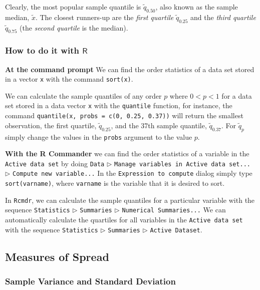 \documentclass[captions=tableheading]{scrbook}
\begin{document}
Clearly, the most popular sample quantile is \(\tilde{q}_{0.50}\), also known as the sample median, \(\tilde{x}\). The closest runners-up are the \emph{first quartile} \(\tilde{q}_{0.25}\) and the \emph{third quartile} \(\tilde{q}_{0.75}\) (the \emph{second quartile} is the median). 
\subsubsection{How to do it with \(\mathsf{R}\)}
\label{sec-3-3-3-1}


\textbf{At the command prompt}
We can find the order statistics of a data set stored in a vector \texttt{x} with the command \texttt{sort(x)}.

We can calculate the sample quantiles of any order \(p\) where \(0<p<1\) for a data set stored in a data vector \texttt{x} with the \texttt{quantile} function, for instance, the command \texttt{quantile(x, probs = c(0, 0.25, 0.37))} will return the smallest observation, the first quartile, \(\tilde{q}_{0.25}\), and the 37th sample quantile, \(\tilde{q}_{0.37}\). For \(\tilde{q}_{p}\) simply change the values in the \texttt{probs} argument to the value \(p\).


\textbf{With the R Commander}
we can find the order statistics of a variable in the \texttt{Active data set} by doing \texttt{Data} \(\triangleright\) \texttt{Manage variables in Active data set...} \(\triangleright\) \texttt{Compute new variable...} In the \texttt{Expression to compute} dialog simply type \texttt{sort(varname)}, where \texttt{varname} is the variable that it is desired to sort.

In \texttt{Rcmdr}, we can calculate the sample quantiles for a particular variable with the sequence \texttt{Statistics} \(\triangleright\) \texttt{Summaries} \(\triangleright\) \texttt{Numerical Summaries...} We can automatically calculate the quartiles for all variables in the \texttt{Active data set} with the sequence \texttt{Statistics} \(\triangleright\) \texttt{Summaries} \(\triangleright\) \texttt{Active Dataset}.
\subsection{Measures of Spread}
\label{sec-3-3-4}
\label{sub-Measures-of-Spread}
\subsubsection{Sample Variance and Standard Deviation}
\label{sec-3-3-4-1}
\end{document}
